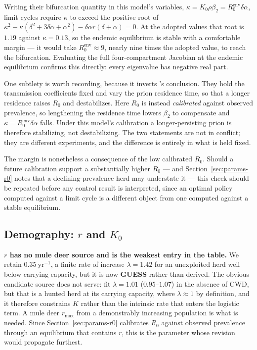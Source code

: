 \documentclass[11pt]{article}
\newcommand{\tagGUESS}{{\footnotesize\textsf{\textbf{\textcolor{red!70!black}{GUESS}}}}}
\begin{document}
Writing their bifurcation quantity in this model's variables, $\kappa = K_0\rho\beta_2 = R_0^{\mathrm{env}}\delta\alpha$, limit cycles require $\kappa$ to exceed the positive root of $\kappa^2 - \kappa(\delta^2 + 3\delta\alpha + \alpha^2) - \delta\alpha r(\delta+\alpha) = 0$. At the adopted values that root is $1.19$ against $\kappa = 0.13$, so the endemic equilibrium is stable with a comfortable margin --- it would take $R_0^{\mathrm{env}} \approx 9$, nearly nine times the adopted value, to reach the bifurcation. Evaluating the full four-compartment Jacobian at the endemic equilibrium confirms this directly: every eigenvalue has negative real part.

One subtlety is worth recording, because it inverts \citeauthor{SharpPastor2011}'s conclusion. They hold the transmission coefficients fixed and vary the prion residence time, so that a longer residence raises $R_0$ and destabilizes. Here $R_0$ is instead \emph{calibrated} against observed prevalence, so lengthening the residence time lowers $\beta_2$ to compensate and $\kappa = R_0^{\mathrm{env}}\delta\alpha$ falls. Under this model's calibration a longer-persisting prion is therefore stabilizing, not destabilizing. The two statements are not in conflict; they are different experiments, and the difference is entirely in what is held fixed.

The margin is nonetheless a consequence of the low calibrated $R_0$. Should a future calibration support a substantially higher $R_0$ --- and Section~\ref{sec:params-r0} notes that a declining-prevalence herd may understate it --- this check should be repeated before any control result is interpreted, since an optimal policy computed against a limit cycle is a different object from one computed against a stable equilibrium.

\subsection{Demography: $r$ and $K_0$}
\label{sec:params-demography}

\textbf{$r$ has no mule deer source and is the weakest entry in the table.} We retain $0.35\ \mathrm{yr}^{-1}$, a finite rate of increase $\lambda = 1.42$ for an unexploited herd well below carrying capacity, but it is now \tagGUESS{} rather than derived. The obvious candidate source does not serve: \citet{Geremia2015} fit $\lambda = 1.01$ ($0.95$--$1.07$) in the absence of CWD, but that is a hunted herd at its carrying capacity, where $\lambda\approx1$ by definition, and it therefore constrains $K$ rather than the intrinsic rate that enters the logistic term. A mule deer $r_{\max}$ from a demonstrably increasing population is what is needed. Since Section~\ref{sec:params-r0} calibrates $R_0$ against observed prevalence through an equilibrium that contains $r$, this is the parameter whose revision would propagate furthest.
\end{document}

